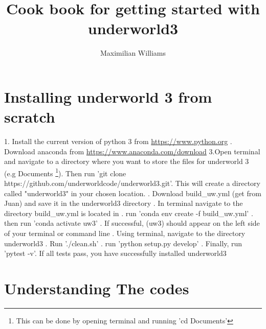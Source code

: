 \documentclass{article}
\title{Cook book for getting started with underworld3}
\author{Maximilian Williams }
\begin{document}
\maketitle

\section*{Installing underworld 3 from scratch}
1. Install the current version of python 3 from \url{https://www.python.org}
. Download anaconda from \url{https://www.anaconda.com/download}
\newline
3.Open terminal and navigate to a directory where you want to store the files for underworld 3 (e.g Documents \footnote{This can be done by opening terminal and running 'cd Documents'}). Then run 'git clone https://github.com/underworldcode/underworld3.git'. This will create a directory called "underworld3" in your chosen location.
. Download build\_uw.yml (get from Juan) and save it in the underworld3 directory
. In terminal navigate to the directory build\_uw.yml is located in
. run 'conda env create -f build\_uw.yml'
. then run 'conda activate uw3'
. If successful, (uw3) should appear on the left side of your terminal or command line
. Using terminal, navigate to the directory underworld3
. Run './clean.sh'
. run 'python setup.py develop'
. Finally, run 'pytest -v'.
\newline
If all tests pass, you have successfully installed underworld3

\section*{Understanding The codes}
\end{document}
